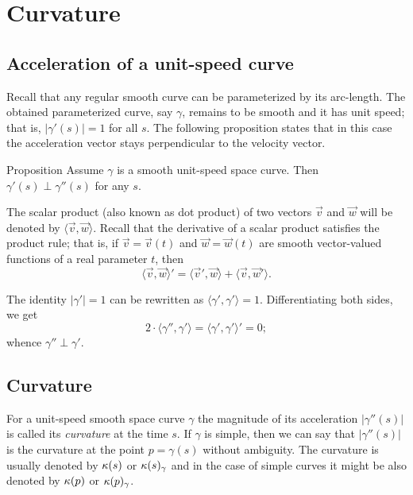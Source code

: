 \chapter{Curvature}

\section{Acceleration of a unit-speed curve}

Recall that any regular smooth curve can be parameterized by its arc-length.
The obtained parameterized curve, say $\gamma$, remains to be smooth and it has unit speed; 
that is, $|\gamma'(s)|=1$ for all $s$.
The following proposition states that in this case
the acceleration vector stays perpendicular to the velocity vector.

\begin{thm}{Proposition}\label{prop:a'-pertp-a''}
Assume $\gamma$ is a smooth unit-speed space curve.
Then $\gamma'(s)\perp \gamma''(s)$ for any $s$.
\end{thm}

The scalar product (also known as dot product) of two vectors $\vec v$ and $\vec w$ will be denoted by $\langle \vec v,\vec w\rangle$.
Recall that the derivative of a scalar product satisfies the product rule;
that is, if $\vec v=\vec v(t)$ and $\vec w=\vec w(t)$ are smooth vector-valued functions of a real parameter $t$, then
\[\langle \vec v,\vec w\rangle'=\langle \vec v',\vec w\rangle+\langle \vec v,\vec w'\rangle.\]

The identity $|\gamma'|=1$ can be rewritten as $\langle\gamma',\gamma'\rangle=1$.
Differentiating both sides, we get
\[2\cdot\langle\gamma'',\gamma'\rangle=\langle\gamma',\gamma'\rangle'=0;\]
whence $\gamma''\perp\gamma'$.
\qeds

\section{Curvature}\label{sec:curvature}

For a unit-speed smooth space curve $\gamma$ the magnitude of its acceleration $|\gamma''(s)|$ is called its \emph{curvature} at the time $s$.
If $\gamma$ is simple, then we can say that $|\gamma''(s)|$ is the curvature at the point $p=\gamma(s)$ without ambiguity.
The curvature is usually denoted by $\kappa(s)$ or $\kappa(s)_\gamma$ and in the case of simple curves it might be also denoted by $\kappa(p)$ or $\kappa(p)_\gamma$.


